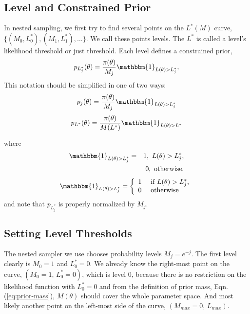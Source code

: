 \documentclass[letterpaper, preprint]{aastex}
\newcommand{\qer}[1]{{\color{red}#1}}
\begin{document}
\subsection{Level and Constrained Prior}
In nested sampling, we first try to find several points on the $L^*(M)$ curve, $\{(M_0, L_0^*),(M_1,L_1^*),\ldots\}$. We call these points levels. The $L^*$ is called a level's likelihood threshold or just threshold. Each level defines a constrained prior,
\begin{equation} 
p_{L_j^*}(\theta) = \frac{\pi(\theta)}{M_j}\mathbbm{1}_{L(\theta)>L_j^*},
\label{eq:constrained-prior}
\end{equation}
\qer{This notation should be simplified in one of two ways:
$$ 
p_j(\theta) = \frac{\pi(\theta)}{M_j}\mathbbm{1}_{L(\theta)>L_j^*} 
$$
$$ 
p_{L^*}(\theta) = \frac{\pi(\theta)}{M(L^*)}\mathbbm{1}_{L(\theta)>L^*} 
$$
}

where
\begin{eqnarray*}
\mathbbm{1}_{L(\theta)>L_j^*} &=& 1,\,\,L(\theta)>L_j^*,\\
& &0,\,\,\mathrm{otherwise.}
\end{eqnarray*}
\qer{
\begin{eqnarray*}
\mathbbm{1}_{L(\theta)>L_j^*} = \left\{ \begin{array}{ll}
               1 & \mbox{ if } L(\theta)>L_j^*,\\
               0 & \mbox{ otherwise} \end{array}  \right.
\end{eqnarray*}
}
and note that $p_{L_j^*}$ is properly normalized by $M_j$. 

\subsection{Setting Level Thresholds}
\qer{The nested sampler we use chooses probability levels $M_j = e^{-j}$.
The first level clearly is $M_0 = 1$ and $L^*_0 = 0$.}
We already know the right-most point on the curve, $\left(M_0 = 1,\,L_0^*=0\right)$, which is level 0, because there is no restriction on the likelihood function with $L_0^*=0$ and from the definition of prior mass, Eqn. (\ref{eq:prior-mass}), $M(\theta)$ should cover the whole parameter space. And most likely another point on the left-most side of the curve, $\left(M_{max}=0,\,L_{max}\right)$.
\end{document}
